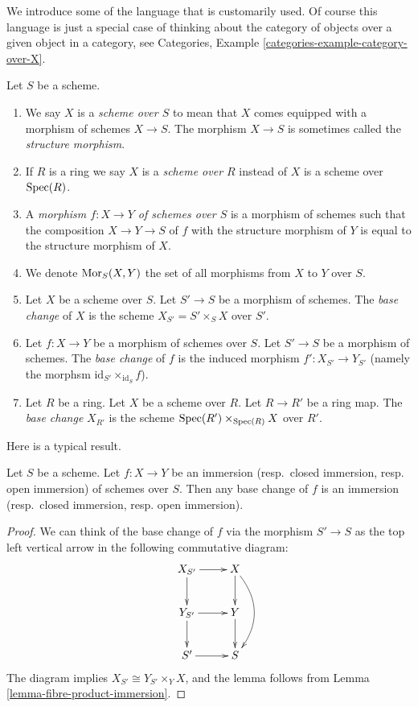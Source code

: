 \medskip\noindent
We introduce some of the language that is customarily used.
Of course this language is just a special case of thinking
about the category of objects over a given object in a category,
see Categories, Example \ref{categories-example-category-over-X}.

\begin{definition}
\label{definition-base-change}
Let $S$ be a scheme.
\begin{enumerate}
\item We say $X$ is a {\it scheme over $S$} to mean that $X$
comes equipped with a morphism of schemes $X \to S$.
The morphism $X \to S$ is sometimes called the
{\it structure morphism}.
\item If $R$ is a ring we say
$X$ is a {\it scheme over $R$} instead of
$X$ is a scheme over $\mathop{\rm Spec}(R)$.
\item A {\it morphism $f : X \to Y$ of schemes over $S$}
is a morphism of schemes such that the composition
$X \to Y \to S$ of $f$ with the structure morphism of $Y$ is
equal to the structure morphism of $X$.
\item We denote $\mathop{\rm Mor}\nolimits_S(X, Y)$ the set of all morphisms
from $X$ to $Y$ over $S$.
\item Let $X$ be a scheme over $S$. Let $S' \to S$ be a
morphism of schemes. The {\it base change} of $X$
is the scheme $X_{S'} = S' \times_S X$ over $S'$.
\item Let $f : X \to Y$ be a morphism of schemes over $S$. Let $S' \to S$
be a morphism of schemes. The {\it base change} of $f$ is
the induced morphism $f' : X_{S'} \to Y_{S'}$ (namely the
morphsm $\text{id}_{S'} \times_{\text{id}_S} f$).
\item Let $R$ be a ring. Let $X$ be a scheme over $R$.
Let $R \to R'$ be a ring map. The {\it base change} $X_{R'}$
is the scheme $\mathop{\rm Spec}(R') \times_{\mathop{\rm Spec}(R)} X$
over $R'$.
\end{enumerate}
\end{definition}

\noindent
Here is a typical result.

\begin{lemma}
\label{lemma-base-change-immersion}
Let $S$ be a scheme. Let $f : X \to Y$ be an
immersion (resp.\ closed immersion, resp. open immersion)
of schemes over $S$. Then any base change of $f$ is an
immersion (resp.\ closed immersion, resp. open immersion).
\end{lemma}

\begin{proof}
We can think of the base change of $f$ via the morphism
$S' \to S$ as the top left vertical arrow in the following
commutative diagram:
$$
\xymatrix{
X_{S'} \ar[r] \ar[d] & X \ar[d] \ar@/^4ex/[dd] \\
Y_{S'} \ar[r] \ar[d] & Y \ar[d] \\
S' \ar[r] & S
}
$$
The diagram implies $X_{S'} \cong Y_{S'} \times_Y X$,
and the lemma follows from Lemma \ref{lemma-fibre-product-immersion}.
\end{proof}

